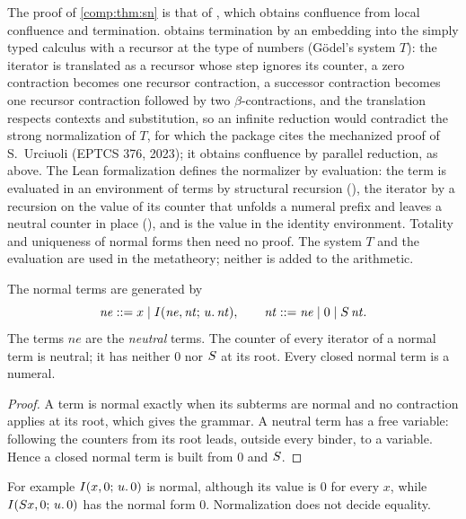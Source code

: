 \begin{remark}
The proof of \cref{comp:thm:sn} is that of , which
obtains confluence from local confluence and termination.
 obtains termination by an embedding into the
simply typed calculus with a recursor at the type of numbers (G\"odel's
system $T$): the iterator is translated as a recursor whose step ignores its
counter, a zero contraction becomes one recursor contraction, a successor
contraction becomes one recursor contraction followed by two
$\beta$-contractions, and the translation respects contexts and
substitution, so an infinite reduction would contradict the strong
normalization of $T$, for which the package cites the mechanized proof of
S.~Urciuoli (EPTCS 376, 2023); it obtains confluence by parallel reduction,
as above. The Lean formalization defines the normalizer by evaluation: the term
is evaluated in an environment of terms by structural recursion
(), the iterator by a recursion on the value of its counter
that unfolds a numeral prefix and leaves a neutral counter in place
(), and  is the value in the identity
environment. Totality and uniqueness of normal forms then need no proof.
The system $T$ and the evaluation are used in the metatheory; neither is
added to the arithmetic.
\end{remark}

\begin{lemma}
\label{comp:lem:fullgrammar}
The normal terms are generated by
\[
 \mathit{ne}::=x\mid I(\mathit{ne},\mathit{nt};\,u.\,\mathit{nt}),\qquad
 \mathit{nt}::=\mathit{ne}\mid0\mid S\,\mathit{nt}.
\]
The terms $\mathit{ne}$ are the \emph{neutral} terms. The counter of every
iterator of a normal term is neutral; it has neither $0$ nor $S$ at its
root. Every closed normal term is a numeral.
\end{lemma}

\begin{proof}
A term is normal exactly when its subterms are normal and no contraction
applies at its root, which gives the grammar. A neutral term has a free
variable: following the counters from its root leads, outside every binder,
to a variable. Hence a closed normal term is built from $0$ and $S$.
\end{proof}

For example $I(x,0;\,u.\,0)$ is normal, although its value is $0$ for every
$x$, while $I(S x,0;\,u.\,0)$ has the normal form $0$. Normalization
does not decide equality.


